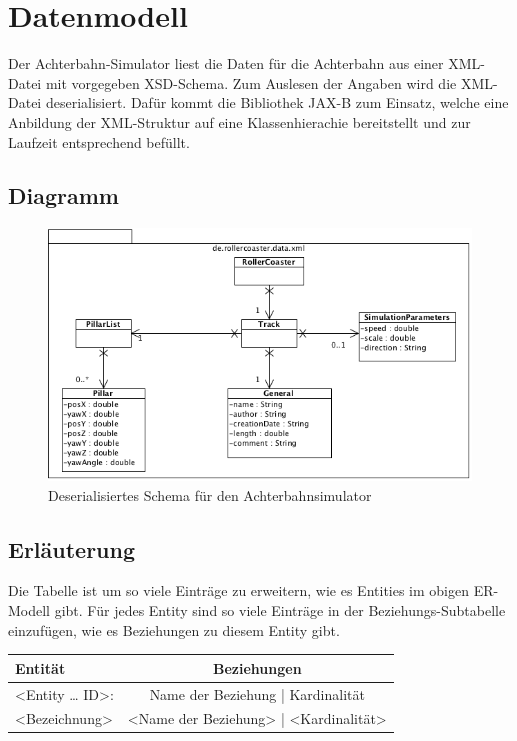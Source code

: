 \chapter{Datenmodell}
Der Achterbahn-Simulator liest die Daten für die Achterbahn aus einer XML-Datei
mit vorgegeben XSD-Schema. Zum Auslesen der Angaben wird die XML-Datei deserialisiert.
Dafür kommt die Bibliothek JAX-B zum Einsatz, welche eine Anbildung der XML-Struktur
auf eine Klassenhierachie bereitstellt und zur Laufzeit entsprechend befüllt.

\section{Diagramm}

\begin{figure}
\includegraphics[width=\linewidth]{bilder/XML.png}
\caption{Deserialisiertes Schema für den Achterbahnsimulator}
\label{fig:xml}
\end{figure}

\section{Erläuterung}
Die Tabelle ist um so viele Einträge zu erweitern, wie es Entities im obigen
ER-Modell gibt. Für jedes Entity sind so viele Einträge in der
Beziehungs-Subtabelle einzufügen, wie es Beziehungen zu diesem Entity gibt.


\begin{tabular}[ht]{|l|c|}
  \hline
  Entität & Beziehungen\\
  \hline\hline
  <Entity … ID>:  & Name der Beziehung |  Kardinalität\\
  \hline\hline\hline
  <Bezeichnung> & <Name der Beziehung> | <Kardinalität>\\
  \hline
\end{tabular}
